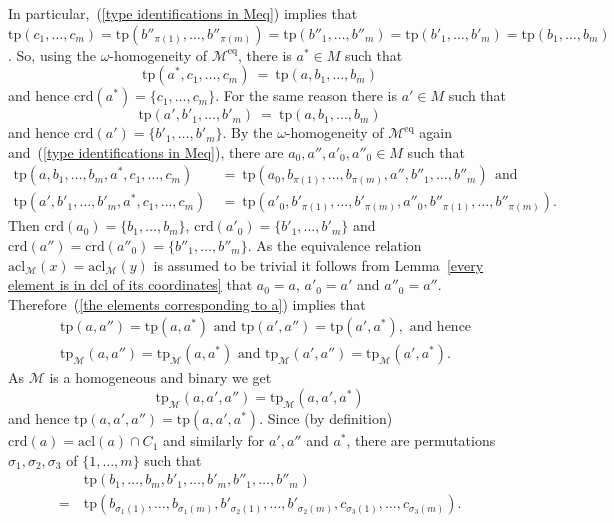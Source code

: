 \documentclass[11pt, twoside]{amsart}
\numberwithin{equation}{section}
\newcommand{\tp}{\mathrm{tp}}
\newcommand{\acl}{\mathrm{acl}}
\newcommand{\crd}{\mathrm{crd}}
\newcommand{\meq}{^{\mathrm{eq}}}
\newcommand{\mcM}{\mathcal{M}}
\begin{document}
\noindent
In particular,~(\ref{type identifications in Meq}) implies that 
$\tp(c_1, \ldots, c_m) = \tp(b''_{\pi(1)}, \ldots, b''_{\pi(m)}) = \tp(b''_1,  \ldots, b''_m) = \tp(b'_1, \ldots, b'_m) = \tp(b_1, \ldots, b_m)$.
So, using the $\omega$-homogeneity of $\mcM\meq$, there is $a^* \in M$ such that 
\[ \tp(a^*, c_1, \ldots, c_m) \ = \ \tp(a, b_1, \ldots, b_m) \]
and hence $\crd(a^*) = \{c_1, \ldots, c_m\}$.
For the same reason there is $a' \in M$ such that
\[ \tp(a', b'_1, \ldots, b'_m) \ = \ \tp(a, b_1, \ldots, b_m) \]
and hence $\crd(a') = \{b'_1, \ldots, b'_m\}$.
By the $\omega$-homogeneity of $\mcM\meq$ again
and~(\ref{type identifications in Meq}), there are $a_0, a'', a'_0, a''_0 \in M$ such that
\begin{align}\label{the elements corresponding to a}
\tp(a, b_1, \ldots, b_m, a^*, c_1, \ldots, c_m) \ &= \ \tp(a_0, b_{\pi(1)}, \ldots, b_{\pi(m)}, a'', b''_1, \ldots, b''_m) \ \ \text{and} \\
\tp(a', b'_1, \ldots, b'_m, a^*, c_1, \ldots, c_m) \ &= \ \tp(a'_0, b'_{\pi(1)}, \ldots, b'_{\pi(m)}, a''_0, b''_{\pi(1)}, \ldots, b''_{\pi(m)}). \nonumber
\end{align}
Then $\crd(a_0) = \{b_1, \ldots, b_m\}$, $\crd(a'_0) = \{b'_1, \ldots, b'_m\}$ and
$\crd(a'') = \crd(a''_0) = \{b''_1, \ldots, b''_m\}$. 
As the equivalence relation $\acl_\mcM(x) = \acl_\mcM(y)$ is assumed to be trivial it follows from
Lemma~\ref{every element is in dcl of its coordinates} that 
$a_0 = a$, $a'_0 = a'$ and $a''_0 = a''$.
Therefore~(\ref{the elements corresponding to a}) implies that
\begin{align*}
&\tp(a, a'') = \tp(a, a^*) \text{ and } \tp(a', a'') = \tp(a', a^*), \text{ and hence} \\
&\tp_\mcM(a, a'') = \tp_\mcM(a, a^*) \text{ and } \tp_\mcM(a', a'') = \tp_\mcM(a', a^*).
\end{align*}
As $\mcM$ is a homogeneous and binary we get
\[ \tp_\mcM(a, a', a'') = \tp_\mcM(a, a', a^*)\]
and hence $\tp(a, a', a'') = \tp(a, a', a^*)$.
Since (by definition) $\crd(a) = \acl(a)  \cap C_1$ and similarly for $a', a''$ and $a^*$, there are 
permutations $\sigma_1, \sigma_2, \sigma_3$ of $\{1, \ldots, m\}$ such that
\begin{align}\label{the long sequences have the same type}
&\tp(b_1, \ldots, b_m, b'_1, \ldots, b'_m, b''_1, \ldots, b''_m) \\ 
= \ 
&\tp(b_{\sigma_1(1)}, \ldots, b_{\sigma_1(m)}, b'_{\sigma_2(1)}, \ldots, b'_{\sigma_2(m)}, c_{\sigma_3(1)}, \ldots, c_{\sigma_3(m)}). 
\nonumber
\end{align}
\end{document}
